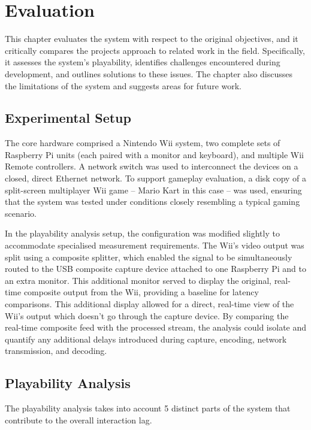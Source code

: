 \chapter{Evaluation}
\label{chapter:evaluation}

This chapter evaluates the system with respect to the original objectives, and it critically compares the projects approach to related work in the field. Specifically, it assesses the system's playability, identifies challenges encountered during development, and outlines solutions to these issues. The chapter also discusses the limitations of the system and suggests areas for future work.

\section{Experimental Setup}
\label{sec:experimental-setup}

The core hardware comprised a Nintendo Wii system, two complete sets of Raspberry Pi units (each paired with a monitor and keyboard), and multiple Wii Remote controllers. A network switch was used to interconnect the devices on a closed, direct Ethernet network. To support gameplay evaluation, a disk copy of a split-screen multiplayer Wii game -- Mario Kart in this case -- was used, ensuring that the system was tested under conditions closely resembling a typical gaming scenario.

In the playability analysis setup, the configuration was modified slightly to accommodate specialised measurement requirements. The Wii’s video output was split using a composite splitter, which enabled the signal to be simultaneously routed to the USB composite capture device attached to one Raspberry Pi and to an extra monitor. This additional monitor served to display the original, real-time composite output from the Wii, providing a baseline for latency comparisons. This additional display allowed for a direct, real-time view of the Wii’s output which doesn't go through the capture device. By comparing the real-time composite feed with the processed stream, the analysis could isolate and quantify any additional delays introduced during capture, encoding, network transmission, and decoding.

\section{Playability Analysis}
\label{sec:playability-analysis}

The playability analysis takes into account 5 distinct parts of the system that
contribute to the overall interaction lag\cite{volkerseekerBestPaper}.

